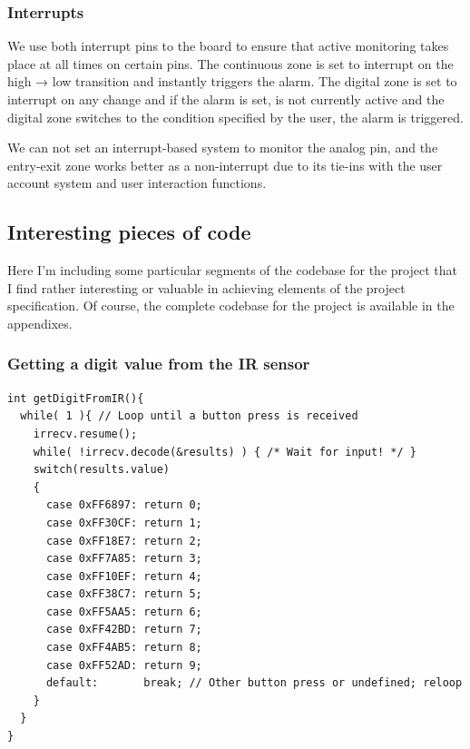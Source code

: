 \documentclass[a4paper,11pt]{article}
\theoremstyle{mytheor}
\begin{document}
\subsubsection{Interrupts}
We use both interrupt pins to the board to ensure that active monitoring takes place at all times on certain pins. The continuous zone is set to interrupt on the high → low transition and instantly triggers the alarm. The digital zone is set to interrupt on any change and if the alarm is set, is not currently active and the digital zone switches to the condition specified by the user, the alarm is triggered.

We can not set an interrupt-based system to monitor the analog pin, and the entry-exit zone works better as a non-interrupt due to its tie-ins with the user account system and user interaction functions.


\subsection{Interesting pieces of code}

Here I'm including some particular segments of the codebase for the project that I find rather interesting or valuable in achieving elements of the project specification. Of course, the complete codebase for the project is available in the appendixes.

\subsubsection{Getting a digit value from the IR sensor}
\begin{lstlisting}
int getDigitFromIR(){
  while( 1 ){ // Loop until a button press is received
    irrecv.resume();
    while( !irrecv.decode(&results) ) { /* Wait for input! */ }
    switch(results.value)
    {
      case 0xFF6897: return 0;
      case 0xFF30CF: return 1;
      case 0xFF18E7: return 2;
      case 0xFF7A85: return 3;
      case 0xFF10EF: return 4;
      case 0xFF38C7: return 5;
      case 0xFF5AA5: return 6;
      case 0xFF42BD: return 7;
      case 0xFF4AB5: return 8;
      case 0xFF52AD: return 9;
      default:       break; // Other button press or undefined; reloop
    }
  }
}
\end{lstlisting}
\end{document}
